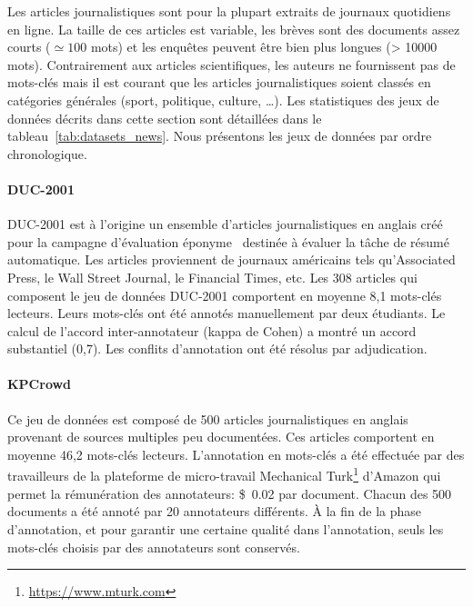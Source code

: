 Les articles journalistiques sont pour la plupart extraits de journaux quotidiens en ligne. La taille de ces articles est variable, les brèves sont des documents assez courts ($\simeq100$ mots) et les enquêtes peuvent être bien plus longues (\textgreater{} \num{10 000} mots).
Contrairement aux articles scientifiques, les auteurs ne fournissent pas de mots-clés mais il est courant que les articles journalistiques soient classés en catégories générales (sport, politique, culture, \ldots).
Les statistiques des jeux de données décrits dans cette section sont détaillées dans le tableau~\ref{tab:datasets_news}.
Nous présentons les jeux de données par ordre chronologique.



\paragraph{DUC-2001~\cite{wan_single_2008}}
DUC-2001 est à l'origine un ensemble d'articles journalistiques en anglais créé pour la campagne d'évaluation éponyme~\cite{over_introduction_2001} destinée à évaluer la tâche de résumé automatique.
Les articles proviennent de journaux américains tels qu'Associated Press, le Wall Street Journal, le Financial Times, etc.
Les 308 articles qui composent le jeu de données DUC-2001 comportent en moyenne 8,1 mots-clés lecteurs. Leurs mots-clés ont été annotés manuellement par deux étudiants.
Le calcul de l'accord inter-annotateur (kappa de Cohen) a montré un accord substantiel (0,7). Les conflits d'annotation ont été résolus par adjudication.


\paragraph{KPCrowd~\cite{marujo_supervised_2012}}
Ce jeu de données est composé de 500 articles journalistiques en anglais provenant de sources multiples peu documentées. Ces articles comportent en moyenne 46,2 mots-clés lecteurs.
L'annotation en mots-clés a été effectuée par des travailleurs de la plateforme de micro-travail Mechanical Turk\footnote{\url{https://www.mturk.com}} d'Amazon qui permet la rémunération des annotateurs: \SI{0.02}[\$]{} par document.
Chacun des 500 documents a été annoté par 20 annotateurs différents.
\`A la fin de la phase d'annotation, et pour garantir une certaine qualité dans l'annotation, seuls les mots-clés choisis par  des annotateurs sont conservés.




